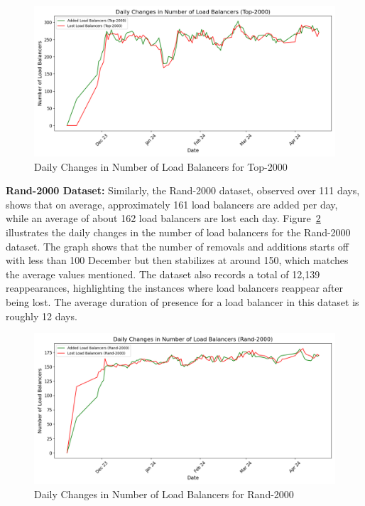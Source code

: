 \documentclass[12pt]{cwru_thesis}
\begin{document}
\begin{figure}[h!]
    \centering
    \includegraphics[width=\linewidth]{figures/load_balancer_changes_Top-2000.png}
    \caption{Daily Changes in Number of Load Balancers for Top-2000}
    \label{fig:top2000_changes}
\end{figure}

\textbf{Rand-2000 Dataset:} Similarly, the Rand-2000 dataset, observed over 111 days, shows that on average, approximately 161 load balancers are added per day, while an average of about 162 load balancers are lost each day. Figure~\ref{fig:rand2000_changes} illustrates the daily changes in the number of load balancers for the Rand-2000 dataset. The graph shows that the number of removals and additions starts off with less than 100  December but then stabilizes at around 150, which matches the average values mentioned. The dataset also records a total of 12,139 reappearances, highlighting the instances where load balancers reappear after being lost. The average duration of presence for a load balancer in this dataset is roughly 12 days.

\begin{figure}[h!]
    \centering
    \includegraphics[width=\linewidth]{figures/load_balancer_changes_Rand-2000.png}
    \caption{Daily Changes in Number of Load Balancers for Rand-2000}
    \label{fig:rand2000_changes}
\end{figure}
\end{document}
